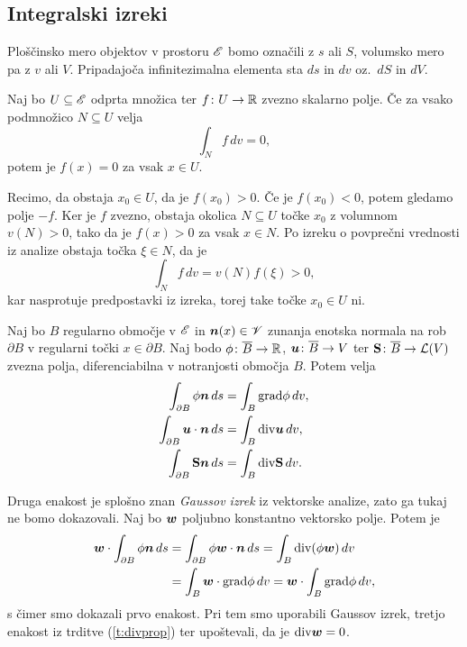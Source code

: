 \subsection{Integralski izreki}


Ploščinsko mero objektov v prostoru $\mathscr E$ bomo označili z $s$ ali $S$, volumsko
mero pa z $v$ ali $V$. Pripadajoča infinitezimalna elementa sta $ds$ in $dv$ oz.~$dS$
in $dV$.

\begin{trditev}\label{t:oiz}
	Naj bo $U\subseteq\mathscr E$ odprta množica ter $f\colon U\to \mathbb R$ zvezno skalarno polje.
	Če za vsako podmnožico $N\subseteq U$ velja
	\[ \int_{N} f\,dv=0, \]
	potem je $f(x)=0$ za vsak $x\in U$.
\end{trditev}
\proof
	Recimo, da obstaja $x_0\in U$, da je $f(x_0)> 0$. Če je $f(x_0)< 0$, potem gledamo polje $-f$.
	Ker je $f$ zvezno, obstaja okolica $N\subseteq U$ točke $x_0$ z volumnom $v(N)>0$, tako da je $f(x)>0$
	za vsak $x\in N$. Po izreku o povprečni vrednosti iz analize obstaja točka $\xi\in N$, da je
	\[ \int_{N}f\,dv=v(N)f(\xi)> 0, \]
	kar nasprotuje predpostavki iz izreka, torej take točke $x_0\in U$ ni.
\endproof

\begin{izrek} \label{i:divtheo}
	Naj bo $B$ regularno območje v $\mathscr E$ in $\boldsymbol n(x)\in\mathscr V$ zunanja enotska normala
	na rob $\partial B$ v regularni točki $x\in\partial B$. Naj bodo $\phi\colon\overline{B}\to\mathbb R$,
	$\boldsymbol u\colon\overline{B}\to V$ ter $\mathbf S\colon\overline{B}\to\mathcal L(V)$
	zvezna polja, diferenciabilna v notranjosti območja $B$. Potem velja
	\begin{align*}
		\int_{\partial B} \phi\boldsymbol n\,ds &= \int_{B} \mathrm{grad}\phi\,dv, \\
		\int_{\partial B} \boldsymbol u\cdot\boldsymbol n\,ds &= \int_{B} \mathrm{div}\boldsymbol u\,dv, \\
		\int_{\partial B} \mathbf S\boldsymbol n\,ds &= \int_{B} \mathrm{div}\mathbf S\,dv.
	\end{align*}
\end{izrek}
\proof
	Druga enakost je splošno znan \emph{Gaussov izrek} iz vektorske analize, zato ga tukaj ne bomo dokazovali.
	Naj bo $\boldsymbol w$ poljubno konstantno vektorsko polje. Potem je
	\begin{align*}
		\boldsymbol w\cdot\int_{\partial B}\phi\boldsymbol n\,ds &= \int_{\partial B}\phi\boldsymbol w\cdot\boldsymbol n\,ds=
		\int_{B}\mathrm{div}(\phi\boldsymbol w)\,dv \\
		&= \int_{B}\boldsymbol w\cdot\mathrm{grad}\phi \,dv = \boldsymbol w\cdot\int_{B}\mathrm{grad}\phi \,dv,
	\end{align*}
	s čimer smo dokazali prvo enakost.
	Pri tem smo uporabili Gaussov izrek, tretjo enakost iz trditve (\ref{t:divprop}) ter
	upoštevali, da je $\mathrm{div}\boldsymbol w=0$.
	
